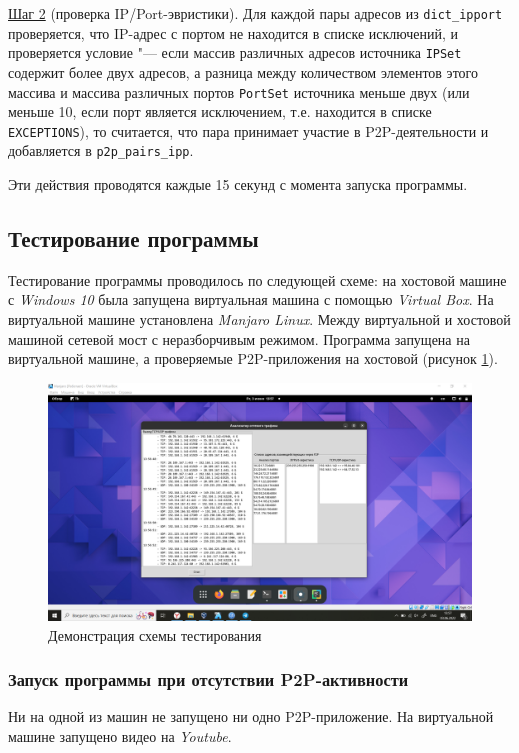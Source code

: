 \documentclass[bachelor, och, coursework]{SCWorks}
\begin{document}
\underline{Шаг 2} (проверка IP/Port-эвристики). 
Для каждой пары адресов из \texttt{dict_ipport} проверяется, что IP-адрес с портом не находится в списке исключений, и проверяется условие "--- если массив различных адресов источника \texttt{IPSet} содержит более двух адресов, а разница между количеством элементов этого массива и массива различных портов \texttt{PortSet}
источника меньше двух (или меньше 10, если порт является исключением, т.е. находится в списке \texttt{EXCEPTIONS}), то считается, что пара принимает участие в P2P-деятельности и добавляется в \texttt{p2p_pairs_ipp}.

Эти действия проводятся каждые 15 секунд с момента запуска программы.

\subsection{Тестирование программы}
Тестирование программы проводилось по следующей схеме: на хостовой машине с \textit{Windows 10} была запущена виртуальная машина с помощью \textit{Virtual Box}. На виртуальной машине установлена \textit{Manjaro Linux}. Между виртуальной и хостовой машиной сетевой мост с неразборчивым режимом. Программа запущена на виртуальной машине, а проверяемые P2P-приложения на хостовой (рисунок \ref{test1}).

\begin{figure}[H]
    \centering
    \includegraphics[width=0.999\textwidth]{test1.png}
    \caption{Демонстрация схемы тестирования}
    \label{test1}
\end{figure}

\subsubsection{Запуск программы при отсутствии P2P-активности}
Ни на одной из машин не запущено ни одно P2P-приложение. На виртуальной машине запущено видео на \textit{Youtube}.
\end{document}
